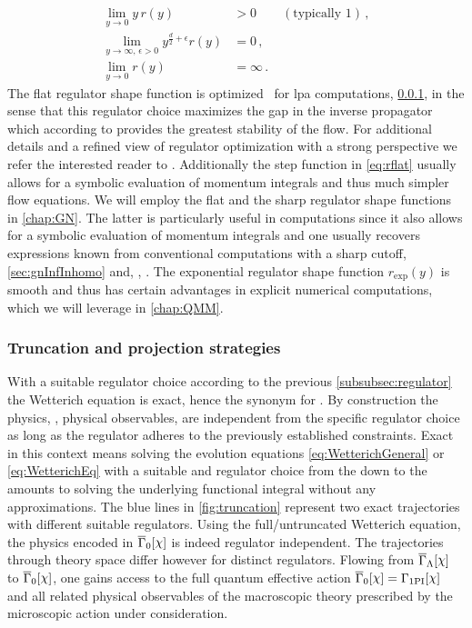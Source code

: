 \begin{subequations}\label{eq:ry}
\begin{align}
	\lim_{y\rightarrow 0 } y\, r(y)&>0\qquad (\text{typically }1)\,,\label{eq:ryA}\\
	\lim_{y\rightarrow \infty,\,\epsilon>0 } y^{\frac{d}{2}+\epsilon}r(y)&=0\,,\label{eq:ryB}\\
	\lim_{y\rightarrow 0 } r(y)&=\infty\,.\label{eq:ryC}
\end{align}
\end{subequations}
The flat regulator shape function is optimized~\cite{Litim:2000ci,Litim:2001up} for \acrshort{lpa} computations, \cf{} \cref{subsubsec:truncation}, in the sense that this regulator choice maximizes the gap in the inverse propagator which according to  provides the greatest stability of the flow.
For additional details and a refined view of regulator optimization with a strong \cfd{} perspective we refer the interested reader to .
Additionally the step function in \cref{eq:rflat} usually allows for a symbolic evaluation of momentum integrals and thus much simpler flow equations.
We will employ the flat and the sharp regulator shape functions in \cref{chap:GN}.
The latter is particularly useful in \mf{} computations since it also allows for a symbolic evaluation of momentum integrals and one usually recovers expressions known from conventional \mf{} computations with a sharp cutoff, \cf{} \cref{sec:gnInfInhomo} and, \eg{}, .
The exponential regulator shape function $r_\mathrm{exp}(y)$ is smooth and thus has certain advantages in explicit numerical computations, which we will leverage in \cref{chap:QMM}.

\subsubsection{Truncation and projection strategies}\label{subsubsec:truncation}
With a suitable regulator choice according to the previous \cref{subsubsec:regulator} the Wetterich equation is exact, hence the synonym \erg{} for \frg{}.
By construction the \ir{} physics, \ie{}, physical observables, are independent from the specific regulator choice as long as the regulator adheres to the previously established constraints.
Exact in this context means solving the evolution equations \eqref{eq:WetterichGeneral} or \eqref{eq:WetterichEq} with a suitable \ic{} and regulator choice from the \uv{} down to the \ir{} amounts to solving the underlying functional integral without any approximations.
The blue lines in \cref{fig:truncation} represent two exact \rg{} trajectories with different suitable regulators.
Using the full/untruncated Wetterich equation, the \ir{} physics encoded in $\FSeaa_0[\FSsf]$ is indeed regulator independent.
The \rg{} trajectories through theory space differ however for distinct regulators.
Flowing from $\FSeaa_\Lambda[\FSsf]$ to $\FSeaa_0[\FSsf]$, one gains access to the full quantum effective action $\FSeaa_0[\FSsf]=\Gamma_\mathrm{1PI}[\FSsf]$ and all related physical observables of the macroscopic theory prescribed by the microscopic action under consideration.

